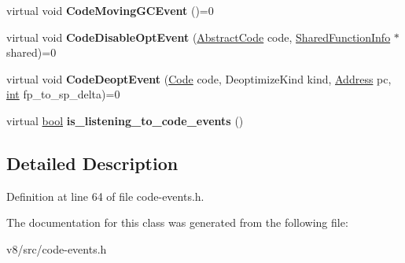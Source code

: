 \begin{DoxyCompactItemize}
virtual void {\bfseries Code\+Moving\+G\+C\+Event} ()=0
\item 
\mbox{\label{classv8_1_1internal_1_1CodeEventListener_a0fedf92d07f171466e2e64e6e7bac9ac}} 
virtual void {\bfseries Code\+Disable\+Opt\+Event} (\mbox{\hyperlink{classv8_1_1internal_1_1AbstractCode}{Abstract\+Code}} code, \mbox{\hyperlink{classv8_1_1internal_1_1SharedFunctionInfo}{Shared\+Function\+Info}} $\ast$shared)=0
\item 
\mbox{\label{classv8_1_1internal_1_1CodeEventListener_a7fecdc05e5f3a033c4bf2d00acb1aa6a}} 
virtual void {\bfseries Code\+Deopt\+Event} (\mbox{\hyperlink{classv8_1_1internal_1_1Code}{Code}} code, Deoptimize\+Kind kind, \mbox{\hyperlink{classuintptr__t}{Address}} pc, \mbox{\hyperlink{classint}{int}} fp\+\_\+to\+\_\+sp\+\_\+delta)=0
\item 
\mbox{\label{classv8_1_1internal_1_1CodeEventListener_ac22ee5c342cc7189360012f8f9cfe0a4}} 
virtual \mbox{\hyperlink{classbool}{bool}} {\bfseries is\+\_\+listening\+\_\+to\+\_\+code\+\_\+events} ()
\end{DoxyCompactItemize}


\subsection{Detailed Description}


Definition at line 64 of file code-\/events.\+h.



The documentation for this class was generated from the following file\+:\begin{DoxyCompactItemize}
\item 
v8/src/code-\/events.\+h\end{DoxyCompactItemize}
